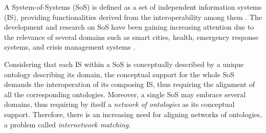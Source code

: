 \documentclass{llncs}
\begin{document}
A System-of-Systems (SoS) is defined as a set of independent information systems (IS), providing functionalities derived from the interoperability among them \cite{boehm2006view}.
The development and research on SoS have been gaining increasing attention due to the relevance of several domains such as smart cities, health, emergency response systems, and crisis management systems \cite{fitzgerald2013model}. 
Considering that each IS within a SoS is conceptually described by a unique ontology describing its domain, the conceptual support for the whole SoS demands the interoperation of its composing IS, thus requiring the alignment of all the corresponding ontologies. Moreover, a single SoS may embrace several domains, thus requiring by itself a \emph{network of ontologies} as its conceptual support. Therefore, there is an increasing need for aligning networks of ontologies, a problem called \emph{internetwork matching}.
\end{document}
